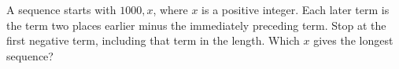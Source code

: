 A sequence starts with $1000,x$, where $x$ is a positive integer. Each later term is the term two places earlier minus the immediately preceding term. Stop at the first negative term, including that term in the length. Which $x$ gives the longest sequence?
